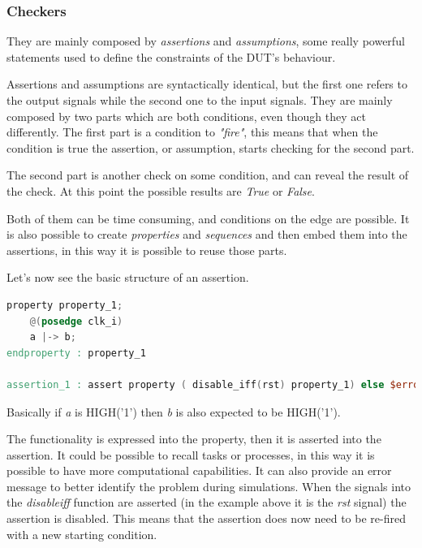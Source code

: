\subsubsection{Checkers}
They are mainly composed by \emph{assertions} and \emph{assumptions}, some really powerful statements used to deﬁne the constraints of the DUT’s behaviour.

Assertions and assumptions are syntactically identical, but the first one refers to the output signals while the second one to the input signals.
They are mainly composed by two parts which are both conditions, even though they act differently. The first part is a condition to \textit{"fire"}, this means that when the condition is true the assertion, or assumption, starts checking for the second part.\cite{verification-book-2016}

The second part is another check on some condition, and can reveal the result of the check. At this point the possible results are \textit{True} or \textit{False}.

Both of them can be time consuming, and conditions on the edge are possible.
It is also possible to create \textit{properties} and \textit{sequences} and then embed them into the assertions, in this way it is possible to reuse those parts.

Let's now see the basic structure of an assertion.
\bigskip

\linespread{1}
\begin{lstlisting}[language=Verilog,style=verilog-style, backgroundcolor=\color{lyel_palette}, frame=tlb]
property property_1;
    @(posedge clk_i)
	a |-> b;
endproperty : property_1

assertion_1 : assert property ( disable_iff(rst) property_1) else $error("")

\end{lstlisting}
\linespread{1.2}
\bigskip

Basically if \emph{a} is HIGH('1') then \emph{b} is also expected to be HIGH('1').

The functionality is expressed into the property, then it is asserted into the assertion. It could be possible to recall tasks or processes, in this way it is possible to have more computational capabilities.
It can also provide an error message to better identify the problem during simulations.
When the signals into the \emph{disable\+iff} function are asserted (in the example above it is the \emph{rst} signal) the assertion is disabled. This means that the assertion does now need to be re-fired with a new starting condition.




